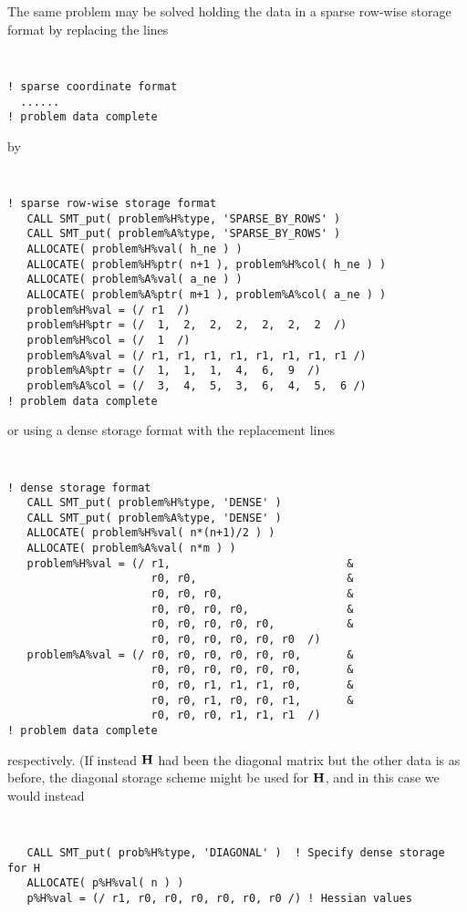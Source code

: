 \documentclass{galahad}
\begin{document}
\noindent
The same problem may be solved holding the data in
a sparse row-wise storage format by replacing the lines
{\tt \small
\begin{verbatim}
! sparse coordinate format
  ......
! problem data complete
\end{verbatim}
}
\noindent
by
{\tt \small
\begin{verbatim}
! sparse row-wise storage format
   CALL SMT_put( problem%H%type, 'SPARSE_BY_ROWS' )
   CALL SMT_put( problem%A%type, 'SPARSE_BY_ROWS' )
   ALLOCATE( problem%H%val( h_ne ) )
   ALLOCATE( problem%H%ptr( n+1 ), problem%H%col( h_ne ) )
   ALLOCATE( problem%A%val( a_ne ) )
   ALLOCATE( problem%A%ptr( m+1 ), problem%A%col( a_ne ) )
   problem%H%val = (/ r1  /)
   problem%H%ptr = (/  1,  2,  2,  2,  2,  2,  2  /)
   problem%H%col = (/  1  /)
   problem%A%val = (/ r1, r1, r1, r1, r1, r1, r1, r1 /)
   problem%A%ptr = (/  1,  1,  1,  4,  6,  9  /)
   problem%A%col = (/  3,  4,  5,  3,  6,  4,  5,  6 /)
! problem data complete
\end{verbatim}
}
\noindent
or using a dense storage format with the replacement lines
{\tt \small
\begin{verbatim}
! dense storage format
   CALL SMT_put( problem%H%type, 'DENSE' )
   CALL SMT_put( problem%A%type, 'DENSE' )
   ALLOCATE( problem%H%val( n*(n+1)/2 ) )
   ALLOCATE( problem%A%val( n*m ) )
   problem%H%val = (/ r1,                           &
                      r0, r0,                       &
                      r0, r0, r0,                   &
                      r0, r0, r0, r0,               &
                      r0, r0, r0, r0, r0,           &
                      r0, r0, r0, r0, r0, r0  /)
   problem%A%val = (/ r0, r0, r0, r0, r0, r0,       &
                      r0, r0, r0, r0, r0, r0,       &
                      r0, r0, r1, r1, r1, r0,       &
                      r0, r0, r1, r0, r0, r1,       &
                      r0, r0, r0, r1, r1, r1  /)
! problem data complete
\end{verbatim}
}
\noindent
respectively.
(If instead ${\mathbf{H}}$ had been the diagonal matrix
but the other data is as before, the diagonal storage scheme
might be used for ${\mathbf{H}}$, and in this case we would instead
{\tt \small
\begin{verbatim}
   CALL SMT_put( prob%H%type, 'DIAGONAL' )  ! Specify dense storage for H
   ALLOCATE( p%H%val( n ) )
   p%H%val = (/ r1, r0, r0, r0, r0, r0, r0 /) ! Hessian values
\end{verbatim}
}
\end{document}

